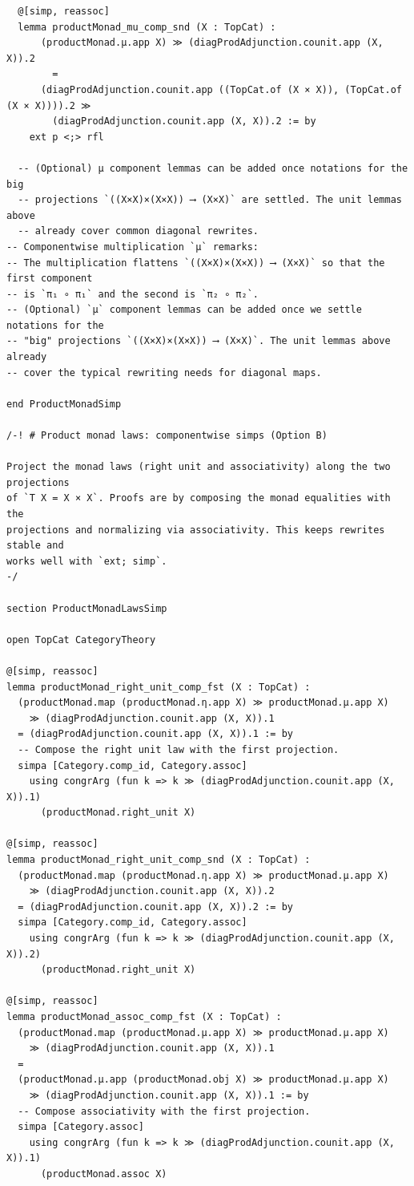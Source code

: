 \documentclass[12pt]{article}
\begin{document}
\begin{lstlisting}
  @[simp, reassoc]
  lemma productMonad_mu_comp_snd (X : TopCat) :
      (productMonad.μ.app X) ≫ (diagProdAdjunction.counit.app (X, X)).2
        =
      (diagProdAdjunction.counit.app ((TopCat.of (X × X)), (TopCat.of (X × X)))).2 ≫
        (diagProdAdjunction.counit.app (X, X)).2 := by
    ext p <;> rfl

  -- (Optional) μ component lemmas can be added once notations for the big
  -- projections `((X×X)×(X×X)) ⟶ (X×X)` are settled. The unit lemmas above
  -- already cover common diagonal rewrites.
-- Componentwise multiplication `μ` remarks:
-- The multiplication flattens `((X×X)×(X×X)) ⟶ (X×X)` so that the first component
-- is `π₁ ∘ π₁` and the second is `π₂ ∘ π₂`.
-- (Optional) `μ` component lemmas can be added once we settle notations for the
-- "big" projections `((X×X)×(X×X)) ⟶ (X×X)`. The unit lemmas above already
-- cover the typical rewriting needs for diagonal maps.

end ProductMonadSimp

/-! # Product monad laws: componentwise simps (Option B)

Project the monad laws (right unit and associativity) along the two projections
of `T X = X × X`. Proofs are by composing the monad equalities with the
projections and normalizing via associativity. This keeps rewrites stable and
works well with `ext; simp`.
-/

section ProductMonadLawsSimp

open TopCat CategoryTheory

@[simp, reassoc]
lemma productMonad_right_unit_comp_fst (X : TopCat) :
  (productMonad.map (productMonad.η.app X) ≫ productMonad.μ.app X)
    ≫ (diagProdAdjunction.counit.app (X, X)).1
  = (diagProdAdjunction.counit.app (X, X)).1 := by
  -- Compose the right unit law with the first projection.
  simpa [Category.comp_id, Category.assoc]
    using congrArg (fun k => k ≫ (diagProdAdjunction.counit.app (X, X)).1)
      (productMonad.right_unit X)

@[simp, reassoc]
lemma productMonad_right_unit_comp_snd (X : TopCat) :
  (productMonad.map (productMonad.η.app X) ≫ productMonad.μ.app X)
    ≫ (diagProdAdjunction.counit.app (X, X)).2
  = (diagProdAdjunction.counit.app (X, X)).2 := by
  simpa [Category.comp_id, Category.assoc]
    using congrArg (fun k => k ≫ (diagProdAdjunction.counit.app (X, X)).2)
      (productMonad.right_unit X)

@[simp, reassoc]
lemma productMonad_assoc_comp_fst (X : TopCat) :
  (productMonad.map (productMonad.μ.app X) ≫ productMonad.μ.app X)
    ≫ (diagProdAdjunction.counit.app (X, X)).1
  =
  (productMonad.μ.app (productMonad.obj X) ≫ productMonad.μ.app X)
    ≫ (diagProdAdjunction.counit.app (X, X)).1 := by
  -- Compose associativity with the first projection.
  simpa [Category.assoc]
    using congrArg (fun k => k ≫ (diagProdAdjunction.counit.app (X, X)).1)
      (productMonad.assoc X)


\end{lstlisting}
\end{document}
